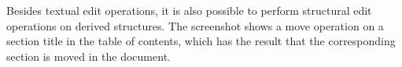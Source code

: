 \documentclass{speauth}
\begin{document}
Besides textual edit operations, it is also possible to perform structural edit operations on derived structures. The screenshot shows a move operation on a section title in the table of contents, which has the result that the corresponding section is moved in the document.


\newcommand{\editScreenshotTrnsFr}[3]{%
%
\begin{center}
\begin{picture}(340,135)(0,0)
\begin{scriptsize}
\put(2,30){ \makebox(160,105){#1}}
\put(2,30){ \epsfig{file=pics/eps/frame.eps, height=105pt} }
\put(180,30){ \makebox(160,105){#2}}
\put(180,30){ \epsfig{file=pics/eps/frame.eps, height=105pt} }
\end{scriptsize}
\put(165,80){ $\Rightarrow$}
\put(96,0) { \makebox(150,30){#3}}
\end{picture}
\end{center}
}
\end{document}
